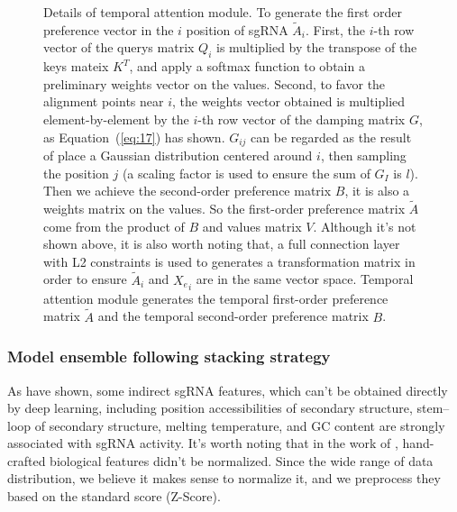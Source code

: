 \documentclass{bioinfo}
\begin{document}
\begin{figure}[!tpb]
\caption{        
    Details of temporal attention module. 
    To generate the first order preference vector in the $i$ position of sgRNA $\tilde{A}_i$. 
    First, the $i$-th row vector of the querys matrix $Q_i$ is multiplied by the transpose of the keys mateix $K^T$, and apply a softmax function to obtain a preliminary weights vector on the values. 
    Second, to favor the alignment points near $i$, the weights vector obtained is multiplied element-by-element by the $i$-th row vector of the damping matrix $G$, as Equation~(\ref{eq:17}) has shown. 
    $G_{ij}$ can be regarded as the result of place a Gaussian distribution centered around $i$, then sampling the position $j$ (a scaling factor is used to ensure the sum of $G_I$ is $l$). 
    Then we achieve the second-order preference matrix $B$, it is also a weights matrix on the values. So the first-order preference matrix $\tilde{A}$ come from the product of $B$ and values matrix $V$.
    Although it's not shown above, it is also worth noting that, a full connection layer with L2 constraints is used to generates a transformation matrix in order to ensure $\tilde{A}_i$ and ${X_e} _i$ are in the same vector space. 
    Temporal attention module generates the temporal first-order preference matrix $\tilde{A}$ and the temporal second-order preference matrix $B$.
    }\label{fig:05}
\end{figure}

\subsubsection{Model ensemble following stacking strategy}

As \citeauthor{wang2019optimized,Li2016ProteinSS,Wang2016ProteinSS} have shown, some indirect sgRNA features, which can't be obtained directly by deep learning, including position accessibilities of secondary structure, stem–loop of secondary structure, melting temperature, and GC content are strongly associated with sgRNA activity. 
It's worth noting that in the work of \citeauthor{wang2019optimized}, hand-crafted biological features didn't be normalized. 
Since the wide range of data distribution, we believe it makes sense to normalize it, and we preprocess they based on the standard score (Z-Score).
\end{document}
